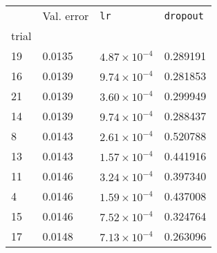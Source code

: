 \begin{tabular}{lp{2.3cm}p{2.3cm}p{2.3cm}}
\toprule
{} &  Val. error &         \texttt{lr} &  \texttt{dropout} \\
trial &             &                     &                   \\
\midrule
19    &      0.0135 & $4.87\times10^{-4}$ &          0.289191 \\
16    &      0.0139 & $9.74\times10^{-4}$ &          0.281853 \\
21    &      0.0139 & $3.60\times10^{-4}$ &          0.299949 \\
14    &      0.0139 & $9.74\times10^{-4}$ &          0.288437 \\
8     &      0.0143 & $2.61\times10^{-4}$ &          0.520788 \\
13    &      0.0143 & $1.57\times10^{-4}$ &          0.441916 \\
11    &      0.0146 & $3.24\times10^{-4}$ &          0.397340 \\
4     &      0.0146 & $1.59\times10^{-4}$ &          0.437008 \\
15    &      0.0146 & $7.52\times10^{-4}$ &          0.324764 \\
17    &      0.0148 & $7.13\times10^{-4}$ &          0.263096 \\
\bottomrule
\end{tabular}
